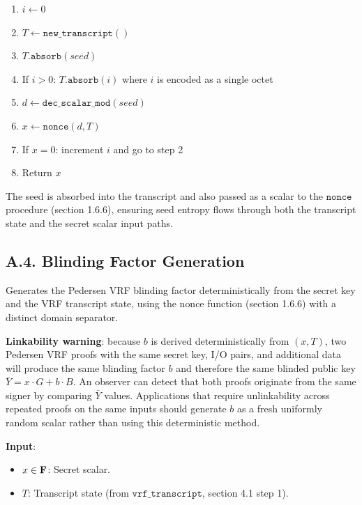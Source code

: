 \documentclass[
]{article}
\providecommand{\tightlist}{%
  \setlength{\itemsep}{0pt}\setlength{\parskip}{0pt}}
\begin{document}
\begin{enumerate}
\def\labelenumi{\arabic{enumi}.}
\tightlist
\item
  \(i \gets 0\)
\item
  \(T \gets \texttt{new\_transcript}()\)
\item
  \(T.\texttt{absorb}(seed)\)
\item
  If \(i > 0\): \(T.\texttt{absorb}(i)\) where \(i\) is encoded as a
  single octet
\item
  \(d \gets \texttt{dec\_scalar\_mod}(seed)\)
\item
  \(x \gets \texttt{nonce}(d, T)\)
\item
  If \(x = 0\): increment \(i\) and go to step 2
\item
  Return \(x\)
\end{enumerate}

The seed is absorbed into the transcript and also passed as a scalar to
the \(\texttt{nonce}\) procedure (section 1.6.6), ensuring seed entropy
flows through both the transcript state and the secret scalar input
paths.

\subsection{A.4. Blinding Factor
Generation}\label{a.4.-blinding-factor-generation}

Generates the Pedersen VRF blinding factor deterministically from the
secret key and the VRF transcript state, using the nonce function
(section 1.6.6) with a distinct domain separator.

\textbf{Linkability warning}: because \(b\) is derived deterministically
from \((x, T)\), two Pedersen VRF proofs with the same secret key, I/O
pairs, and additional data will produce the same blinding factor \(b\)
and therefore the same blinded public key
\(\bar{Y} = x \cdot G + b \cdot B\). An observer can detect that both
proofs originate from the same signer by comparing \(\bar{Y}\) values.
Applications that require unlinkability across repeated proofs on the
same inputs should generate \(b\) as a fresh uniformly random scalar
rather than using this deterministic method.

\textbf{Input}:

\begin{itemize}
\tightlist
\item
  \(x \in \bold{F}\): Secret scalar.
\item
  \(T\): Transcript state (from \(\texttt{vrf\_transcript}\), section
  4.1 step 1).
\end{itemize}
\end{document}
